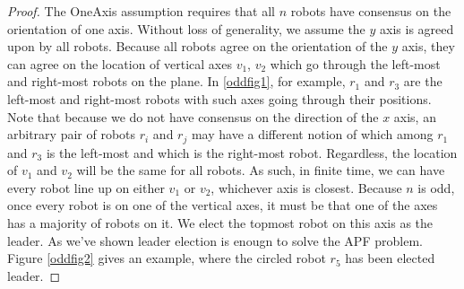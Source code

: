 \documentclass[preprint,10pt]{elsarticle}
\begin{document}
	\begin{proof}
		The OneAxis assumption requires that all $n$ robots have consensus on the orientation of one axis. 
		Without loss of generality, we assume the $y$ axis is agreed upon by all robots. Because all robots
		agree on the orientation of the $y$ axis, they can agree on the location of vertical axes $v_1$, 
		$v_2$ which go through the left-most and right-most robots on the plane. In \ref{oddfig1}, for example,
		$r_1$ and $r_3$ are the left-most and right-most robots with such axes going through their positions.
		Note that because we do not have consensus on the direction of the $x$ axis, an arbitrary pair of robots
		$r_i$ and $r_j$ may have a different notion of which among $r_1$ and $r_3$ is the left-most and which is
		the right-most robot. Regardless, the location of $v_1$ and $v_2$ will be the same for all robots.
		As such, in finite time, we can have every robot line up on either $v_1$ or $v_2$, whichever
		axis is closest. Because $n$ is odd, once every robot is on one of the vertical axes, it must
		be that one of the axes has a majority of robots on it. We elect the topmost robot
		on this axis as the leader. As we've shown leader election is enougn to solve the APF problem.
		Figure \ref{oddfig2} gives an example, where the circled robot $r_5$ has been elected leader.


	\end{proof}
\end{document}
